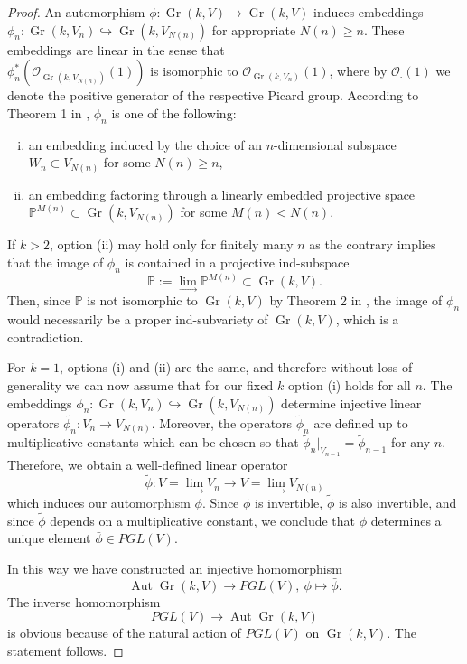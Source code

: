 \documentclass[11pt]{amsart}
\numberwithin{equation}{section}
\theoremstyle{plain}
\theoremstyle{remark}
\theoremstyle{remark}
\theoremstyle{construction}
\begin{document}
\begin{proof} An automorphism $\phi: \operatorname{Gr}(k,V)\to \operatorname{Gr}(k,V)$ induces embeddings $\phi_n: \operatorname{Gr}(k,V_n)\hookrightarrow\operatorname{Gr}(k,V_{N(n)})$ for appropriate $N(n)\geq n$. These embeddings are linear in the sense that \\$\phi^*_n( \mathcal O_{\operatorname{Gr}(k,V_{N(n)})}(1))$ is isomorphic to $\mathcal O_{\operatorname{Gr}(k,V_n)}(1)$, where by $\mathcal{O}_{\cdot}(1)$ we denote the positive generator of the respective Picard group. According to Theorem 1 in \cite{PT}, $\phi_n$ is one of the following:


\begin{enumerate}[(i)]
\item an embedding induced by the choice of an $n$-dimensional subspace $W_n\subset V_{N(n)}$ for some $N(n)\geq n$,
\item an embedding factoring through  a linearly embedded projective space $\mathbb{P}^{M(n)}\subset  \operatorname{Gr}(k, V_{N(n)})$ for some $M(n)<N(n)$.
\end{enumerate}



If $k>2$, option (ii) may hold only for  finitely many $n$ as the contrary implies that the image of $\phi_n$ is contained in a projective ind-subspace $$\mathbb{P}:=\lim_{\longrightarrow} \mathbb{P}^{M(n)}\subset  \operatorname{Gr}(k,V).$$ Then, since $\mathbb{P}$ is not isomorphic to $ \operatorname{Gr}(k,V)$ by Theorem 2 in \cite{PT}, the image of $\phi_n$ would necessarily be a proper ind-subvariety of $ \operatorname{Gr}(k,V)$, which is a contradiction.

For $k=1$, options (i) and (ii) are the same, and therefore without loss of generality we can now assume that for our fixed $k$ option (i) holds for all $n$. The embeddings $\phi_n: \operatorname{Gr}(k,V_n)\hookrightarrow  \operatorname{Gr}(k,V_{N(n)})$ determine injective linear operators $\tilde{\phi_n}:V_n\to V_{N(n)}$. Moreover, the operators $\tilde \phi_n$ are defined up to multiplicative constants which can be chosen so that $\tilde{\phi}_{n}|_{V_{n-1}}=\tilde{\phi}_{n-1}$ for any $n$. Therefore, we obtain a well-defined linear operator
$$\tilde{\phi}: V=\lim_{\longrightarrow} V_n\to V=\lim_{\longrightarrow}V_{N(n)}$$
which induces our automorphism $\phi$. Since $\phi$ is invertible, $\tilde \phi$ is also invertible, and since $\tilde \phi$ depends on a multiplicative constant, we conclude that $\phi$ determines a unique element $ \bar{\phi}\in PGL(V)$.

In this way we have constructed an injective homomorphism
$$ \operatorname{Aut}\operatorname{Gr}(k,V)\to PGL(V),\: \phi \mapsto \bar\phi.$$
The inverse homomorphism $$ PGL(V)\to \operatorname{Aut}\operatorname{Gr}(k,V)$$ is obvious because of the natural action of $PGL(V)$ on $\operatorname{Gr}(k,V)$. The statement follows.
\end{proof}
\end{document}
